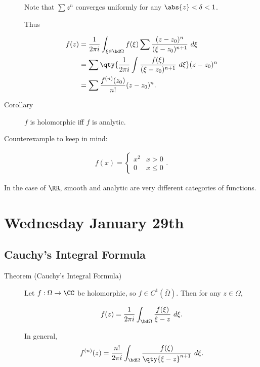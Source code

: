 \begin{description}
Note that \(\sum z^n\) converges uniformly for any
\(\abs{z} < \delta < 1\).

Thus

\begin{align*}
f(z) 
&= \frac{1}{2\pi i} \int_{\xi \in \bd\Omega} f(\xi) \sum \frac{(z-z_0)^n}{(\xi - z_0)^{n+1}} ~d\xi \\
&= \sum \qty{ \frac {1}{2\pi i} \int \frac{f(\xi)  }{(\xi - z_0)^{n+1}} ~d\xi} (z-z_0)^n \\
&= \sum \frac{f^{(n)} (z_0)}{n!} (z-z_0)^n
.\end{align*}
\item[Corollary]
\(f\) is holomorphic iff \(f\) is analytic.
\end{description}

Counterexample to keep in mind:

\begin{align*}
f(x) = \begin{cases}
x^2 & x > 0 \\
0 & x\leq 0
\end{cases}
.\end{align*}

In the case of \(\RR\), smooth and analytic are very different
categories of functions.

\hypertarget{wednesday-january-29th}{%
\section{Wednesday January 29th}\label{wednesday-january-29th}}

\hypertarget{cauchys-integral-formula}{%
\subsection{Cauchy's Integral Formula}\label{cauchys-integral-formula}}

\begin{description}
\item[Theorem (Cauchy's Integral Formula)]
Let \(f: \Omega \to \CC\) be holomorphic, so \(f\in C^1(\bar \Omega)\).
Then for any \(z\in \Omega\),

\begin{align*}
f(z) = \frac{1}{2\pi i} \int_{\bd \Omega} \frac{f(\xi)}{\xi - z} ~d\xi
.\end{align*}

In general, \begin{align*}
f^{(n)}(z) = \frac{n!}{2\pi i} \int_{\bd \Omega} \frac{f(\xi)}{\qty{\xi - z}^{n+1}} ~d\xi
.\end{align*}
\end{description}

